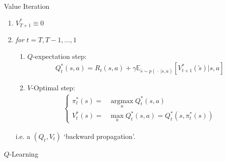 \begin{algorithm}{Value Iteration}
        \begin{enumerate}[topsep=2pt,itemsep=2pt]
            \item $ V^*_{T+1}\equiv 0 $
            \item \textit{for} $ t=T,T-1,\ldots,1 $
            \begin{enumerate}[topsep=2pt,itemsep=2pt]
                \item $ Q $-expectation step:
                \begin{align}
                  Q^*_t(s,a)=R_t(s,a)+\gamma \mathbb{E}_{\tilde{s}\sim p(\, \cdot \, |s,a)}\left[ V^*_{t+1}(\tilde{s}) \big|s,a\right]    
                \end{align}
                \item $ V $-Optimal step:
                \begin{align}
                     \begin{cases}\label{EqaValueIterationProcess}
                        \pi^*_t(s)=&\mathop{\arg\max}\limits_{a}Q_t^*(s,a)\\
                        V^*_t(s)= & \mathop{\max}\limits_{a} Q^*_t(s,a)=Q^*_{t}(s,\pi^*_t(s)) 
                     \end{cases}
                \end{align}
            \end{enumerate}
            i.e. a $ (Q_t,V_t) $ `backward propagation'.
        \end{enumerate}
    \end{algorithm}

\begin{point}
    $ Q $-Learning
\end{point}

